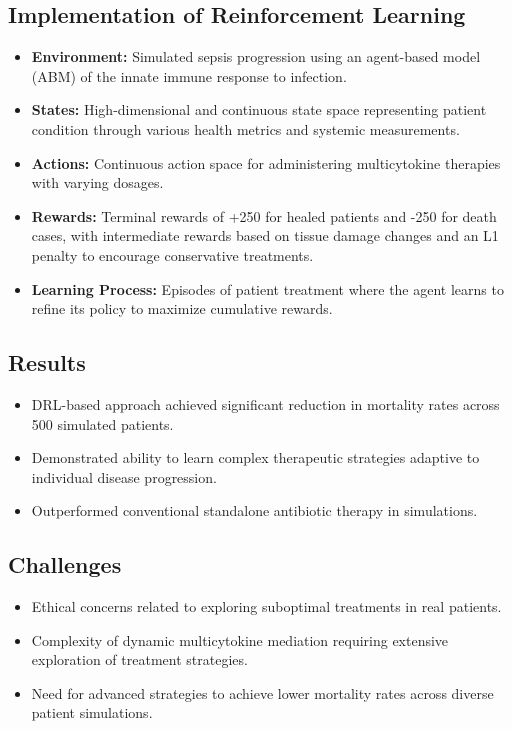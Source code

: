 \subsection*{Implementation of Reinforcement Learning}
\begin{itemize}
    \item \textbf{Environment:} Simulated sepsis progression using an agent-based model (ABM) of the innate immune response to infection.
    \item \textbf{States:} High-dimensional and continuous state space representing patient condition through various health metrics and systemic measurements.
    \item \textbf{Actions:} Continuous action space for administering multicytokine therapies with varying dosages.
    \item \textbf{Rewards:} Terminal rewards of +250 for healed patients and -250 for death cases, with intermediate rewards based on tissue damage changes and an L1 penalty to encourage conservative treatments.
    \item \textbf{Learning Process:} Episodes of patient treatment where the agent learns to refine its policy to maximize cumulative rewards.
\end{itemize}

\subsection*{Results}
\begin{itemize}
    \item DRL-based approach achieved significant reduction in mortality rates across 500 simulated patients.
    \item Demonstrated ability to learn complex therapeutic strategies adaptive to individual disease progression.
    \item Outperformed conventional standalone antibiotic therapy in simulations.
\end{itemize}

\subsection*{Challenges}
\begin{itemize}
    \item Ethical concerns related to exploring suboptimal treatments in real patients.
    \item Complexity of dynamic multicytokine mediation requiring extensive exploration of treatment strategies.
    \item Need for advanced strategies to achieve lower mortality rates across diverse patient simulations.
\end{itemize}


